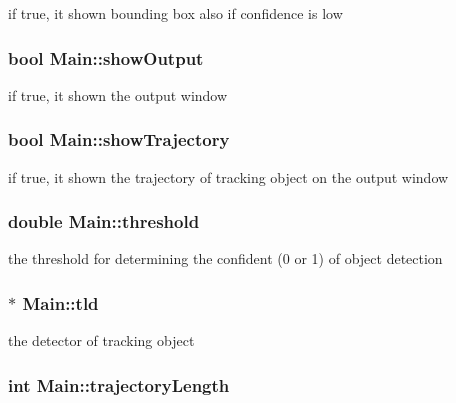 if true, it shown bounding box also if confidence is low 

\hypertarget{classMain_ae687ebbff0ebf899894316a3db89fdb5}{
\subsubsection[{show\-Output}]{\setlength{\rightskip}{0pt plus 5cm}bool Main\-::show\-Output}}\label{classMain_ae687ebbff0ebf899894316a3db89fdb5}


if true, it shown the output window 

\hypertarget{classMain_a1e3ed8eee4f7fe8633419512caa544c2}{
\subsubsection[{show\-Trajectory}]{\setlength{\rightskip}{0pt plus 5cm}bool Main\-::show\-Trajectory}}\label{classMain_a1e3ed8eee4f7fe8633419512caa544c2}


if true, it shown the trajectory of tracking object on the output window 

\hypertarget{classMain_a635e9bb74aaa1960aafcd75d21a8784f}{
\subsubsection[{threshold}]{\setlength{\rightskip}{0pt plus 5cm}double Main\-::threshold}}\label{classMain_a635e9bb74aaa1960aafcd75d21a8784f}


the threshold for determining the confident (0 or 1) of object detection 

\hypertarget{classMain_acd79fe4086a18124923606aabb982fec}{
\subsubsection[{tld}]{$\ast$ Main\-::tld}}\label{classMain_acd79fe4086a18124923606aabb982fec}


the detector of tracking object 

\hypertarget{classMain_a9d46f95b41276d2beeb9b98db1267e98}{
\subsubsection[{trajectory\-Length}]{\setlength{\rightskip}{0pt plus 5cm}int Main\-::trajectory\-Length}}\label{classMain_a9d46f95b41276d2beeb9b98db1267e98}


